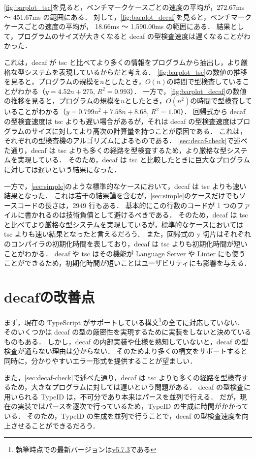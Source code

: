 \ref{fig:barplot_tsc}を見ると，ベンチマークケースごとの速度の平均が，272.67ms 〜 451.67ms の範囲にある．
対して，\ref{fig:barplot_decaf}を見ると，ベンチマークケースごとの速度の平均が， 18.66ms 〜 1,590.00ms の範囲にある．
結果として，プログラムのサイズが大きくなると decaf の型検査速度は遅くなることがわかった．

これは，decaf が tsc と比べてより多くの情報をプログラムから抽出し，より厳格な型システムを表現しているからだと考える．
\ref{fig:barplot_tsc}の数値の推移を見ると，プログラムの規模を$n$としたとき，$O(n)$の時間で型検査していることがわかる（$y = 4.52n + 275$, $R^2 = 0.993$）．
一方で，\ref{fig:barplot_decaf}の数値の推移を見ると，プログラムの規模を$n$としたとき，$O(n^2)$の時間で型検査していることがわかる（$y = 0.799n^2 + 7.58n + 8.68$, $R^2 = 1.00$）．
回帰式から decaf の型検査速度は tsc よりも遅い場合があるが，それは decaf の型検査速度はプログラムのサイズに対してより高次の計算量を持つことが原因である．
これは，それぞれの型検査機のアルゴリズムによるものである．
\ref{sec:decaf-check}で述べた通り，decaf は tsc よりも多くの経路を型検査するため，より厳格な型システムを実現している．
そのため，decaf は tsc と比較したときに巨大なプログラムに対しては遅いという結果になった．

一方で，\ref{sec:simple}のような標準的なケースにおいて，decaf は tsc よりも速い結果となった．
これは若干の結果論を含むが，\ref{sec:simple}のケースだけでもソースコードの長さは，2949 行もある．
基本的にこの行数のコードが 1 つのファイルに書かれるのは技術負債として避けるべきである．
そのため，decaf は tsc と比べてより厳格な型システムを実現しているが，標準的なケースにおいては tsc よりも速い結果となったと言えるだろう．
また，回帰式の y 切片はそれぞれのコンパイラの初期化時間を表しており，decaf は tsc よりも初期化時間が短いことがわかる．
decaf や tsc はその機能が Language Server や Linter にも使うことができるため，初期化時間が短いことはユーザビリティにも影響を与える．

\section{decafの改善点}

まず，現在の TypeScript がサポートしている構文\footnote{執筆時点での最新バージョンは\href{https://github.com/microsoft/TypeScript/tree/v5.7.3}{v5.7.3}である}の全てに対応していない．
そのいくつかは decaf の型の厳密性を実現するために実装をしないと決めているものもある．
しかし，decaf の内部実装や仕様を熟知していないと，decaf の型検査が通らない理由は分からない．
そのためより多くの構文をサポートすると同時に，分かりやすいエラー形式を提供することが望ましい．

また，\ref{sec:decaf-check}で述べた通り，decaf は tsc よりも多くの経路を型検査するため，大きなプログラムに対しては遅いという問題がある．
decaf の型検査に用いられる TypeID は，不可分であり本来はパースを並列で行える．
だが，現在の実装ではパースを逐次で行っているため，TypeID の生成に時間がかかっている．
そのため，TypeID の生成を並列で行うことで，decaf の型検査速度を向上させることができるだろう．
